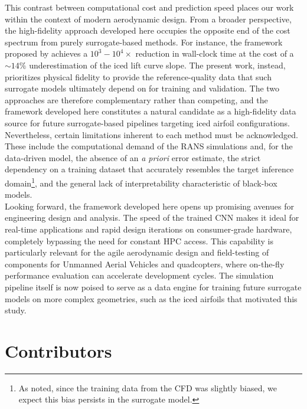 This contrast between computational cost and prediction speed places our work within the context of modern aerodynamic design. From a broader perspective, the high-fidelity approach developed here occupies the opposite end of the cost spectrum from purely surrogate-based methods. For instance, the framework proposed by \citet{Cuozzo2026AIDriven} achieves a $10^3-10^4\times$ reduction in wall-clock time at the cost of a $\sim14\%$ underestimation of the iced lift curve slope. The present work, instead, prioritizes physical fidelity to provide the reference-quality data that such surrogate models ultimately depend on for training and validation. The two approaches are therefore complementary rather than competing, and the framework developed here constitutes a natural candidate as a high-fidelity data source for future surrogate-based pipelines targeting iced airfoil configurations.\\

Nevertheless, certain limitations inherent to each method must be acknowledged. These include the computational demand of the RANS simulations and, for the data-driven model, the absence of an \textit{a priori} error estimate, the strict dependency on a training dataset that accurately resembles the target inference domain\footnote{As noted, since the training data from the CFD was slightly biased, we expect this bias persists in the surrogate model.}, and the general lack of interpretability characteristic of black-box models.\\

Looking forward, the framework developed here opens up promising avenues for engineering design and analysis. The speed of the trained CNN makes it ideal for real-time applications and rapid design iterations on consumer-grade hardware, completely bypassing the need for constant HPC access. This capability is particularly relevant for the agile aerodynamic design and field-testing of components for Unmanned Aerial Vehicles and quadcopters, where on-the-fly performance evaluation can accelerate development cycles. The simulation pipeline itself is now poised to serve as a data engine for training future surrogate models on more complex geometries, such as the iced airfoils that motivated this study.


\section{Contributors}
\label{sec:06_Contributors}

